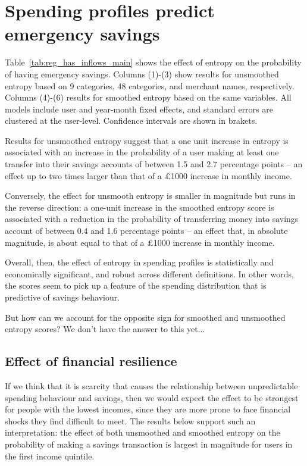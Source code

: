 
\section{Spending profiles predict emergency savings}%
\label{sec:results}

Table~\ref{tab:reg_has_inflows_main} shows the effect of entropy on the
probability of having emergency savings. Columns (1)-(3) show results for
unsmoothed entropy based on 9 categories, 48 categories, and merchant names,
respectively. Columns (4)-(6) results for smoothed entropy based on the same
variables. All models include user and year-month fixed effects, and standard
errors are clustered at the user-level. Confidence intervals are shown in
brakets.



Results for unsmoothed entropy suggest that a one unit increase in entropy is
associated with an increase in the probability of a user making at least one
transfer into their savings accounts of between 1.5 and 2.7 percentage points
-- an effect up to two times larger than that of a \pounds1000 increase in
monthly income.

Conversely, the effect for unsmooth entropy is smaller in magnitude but runs in
the reverse direction: a one-unit increase in the smoothed entropy score is
associated with a reduction in the probability of transferring money into
savings account of between 0.4 and 1.6 percentage points -- an effect that, in
absolute magnitude, is about equal to that of a \pounds1000 increase in monthly
income.

Overall, then, the effect of entropy in spending profiles is statistically and
economically significant, and robust across different definitions. In other
words, the scores seem to pick up a feature of the spending distribution that
is predictive of savings behaviour.

But how can we account for the opposite sign for smoothed and unsmoothed
entropy scores? We don't have the answer to this yet... 


\subsection{Effect of financial resilience}%
\label{sub:effect_of_financial_resilience}




If we think that it is scarcity that causes the relationship between
unpredictable spending behaviour and savings, then we would expect the effect
to be strongest for people with the lowest incomes, since they are more prone
to face financial shocks they find difficult to meet. The results below support
such an interpretation: the effect of both unsmoothed and smoothed entropy on
the probability of making a savings transaction is largest in magnitude for
users in the first income quintile.

